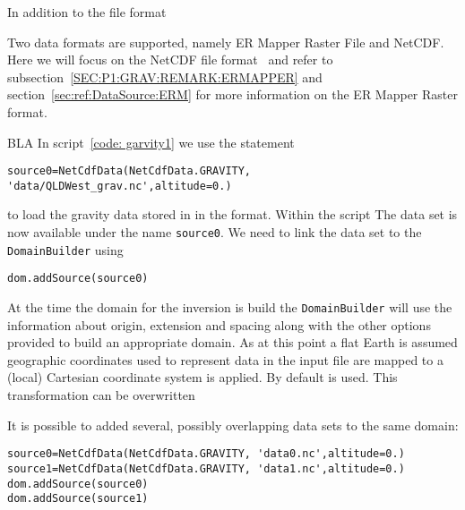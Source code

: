 
In addition to the \netcdf file format 


Two data formats are supported, namely ER Mapper Raster File and NetCDF. Here we will
focus on the NetCDF file format~\cite{NETCDF} and refer to subsection~\ref{SEC:P1:GRAV:REMARK:ERMAPPER} and
section~\ref{sec:ref:DataSource:ERM} for more information on the ER Mapper Raster format.

BLA
In script~\ref{code: garvity1} we use the statement 
\begin{verbatim}
source0=NetCdfData(NetCdfData.GRAVITY, 'data/QLDWest_grav.nc',altitude=0.)
\end{verbatim}
  
to load the gravity data stored in  in the \netcdf format. 
Within the script The data set is now available under the name \verb|source0|. We need to link
the data set to the \verb|DomainBuilder| using 
\begin{verbatim}
dom.addSource(source0)
\end{verbatim}
At the time the domain for the inversion is build the \verb|DomainBuilder| will use the information about
origin, extension and spacing along with the other options provided to build an appropriate domain. As at this point a
flat Earth is assumed geographic coordinates used to represent data in the input file 
are mapped to a (local) Cartesian coordinate system is applied. By default  is used. 
This transformation can be overwritten       
   
It is possible to added several, possibly overlapping data sets to the same domain:
\begin{verbatim}
source0=NetCdfData(NetCdfData.GRAVITY, 'data0.nc',altitude=0.)
source1=NetCdfData(NetCdfData.GRAVITY, 'data1.nc',altitude=0.)
dom.addSource(source0)
dom.addSource(source1)
\end{verbatim}

